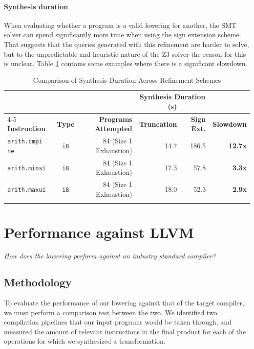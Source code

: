 \paragraph{Synthesis duration}
When evaluating whether a program is a valid lowering for another, the SMT solver can spend
significantly more time when using the sign extension scheme. That suggests that the queries
generated with this refinement are harder to solve, but to the unpredictable and heuristic 
nature of the Z3 solver the reason for this is unclear. Table \ref{tab:synthesis_duration_comparison} 
contains
some examples where there is a significant slowdown.
\begin{table}[htbp]
    \centering
    \small
    \caption{Comparison of Synthesis Duration Across Refinement Schemes}
    \begin{tabular}{@{}lcrrrr@{}}
        \toprule
        & & & \multicolumn{2}{c}{\textbf{Synthesis Duration (s)}} & \\
        \cmidrule{4-5}
        \textbf{Instruction} & \textbf{Type} & \textbf{Programs Attempted} & \textbf{Truncation} & \textbf{Sign Ext.} & \textbf{Slowdown} \\
        \midrule
        \texttt{arith.cmpi ne} & \texttt{i8} & 84 (Size 1 Exhaustion) & 14.7 & 186.5 & \textbf{12.7x} \\
        \texttt{arith.minsi} & \texttt{i8} & 84 (Size 1 Exhaustion) & 17.3 & 57.8 & \textbf{3.3x} \\
        \texttt{arith.maxui} & \texttt{i8} & 84 (Size 1 Exhaustion) & 18.0 & 52.3 & \textbf{2.9x} \\
        \addlinespace
        \bottomrule
    \end{tabular}
    \label{tab:synthesis_duration_comparison}
\end{table}

\section{Performance against LLVM}
\emph{How does the lowering perform against an industry standard compiler?}
\label{eval-performance}

\subsection{Methodology}

To evaluate the performance of our lowering against that of the target compiler, we
must perform a comparison test between the two. We identified two compilation
pipelines that our input programs would be taken through, and measured the 
amount of relevant instructions in the final product for each of the operations
for which we synthesized a transformation.

